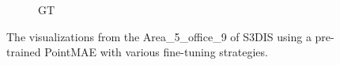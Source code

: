 \begin{figure}
\begin{subfigure}{0.235\textwidth}
        \caption{GT}
        \label{fig:s3dis6}
    \end{subfigure}
    \caption{The visualizations from the Area\_5\_office\_9 of S3DIS using a pre-trained PointMAE with various fine-tuning strategies.}
    \label{fig:s3dis}
\end{figure}